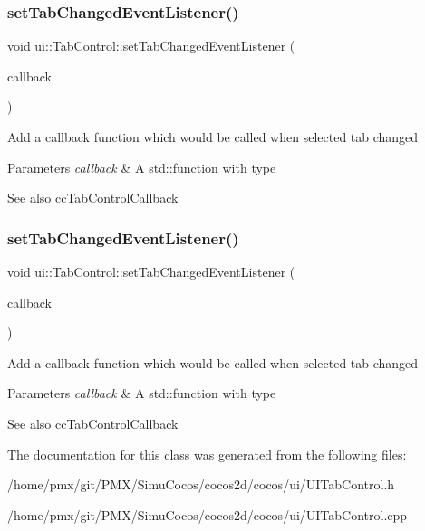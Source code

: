 \subsubsection{\texorpdfstring{set\+Tab\+Changed\+Event\+Listener()}{setTabChangedEventListener()}\hspace{0.1cm}{\footnotesize\ttfamily [1/2]}}
{\footnotesize\ttfamily void ui\+::\+Tab\+Control\+::set\+Tab\+Changed\+Event\+Listener (\begin{DoxyParamCaption}\item[{const cc\+Tab\+Control\+Callback \&}]{callback }\end{DoxyParamCaption})}

Add a callback function which would be called when selected tab changed 
\begin{DoxyParams}{Parameters}
{\em callback} & A std\+::function with type \\
\hline
\end{DoxyParams}
\begin{DoxySeeAlso}{See also}
{\ttfamily cc\+Tab\+Control\+Callback} 
\end{DoxySeeAlso}
\mbox{\label{classui_1_1TabControl_a16fecfa3c0550e2afcfe9280aa633ada}} 
\subsubsection{\texorpdfstring{set\+Tab\+Changed\+Event\+Listener()}{setTabChangedEventListener()}\hspace{0.1cm}{\footnotesize\ttfamily [2/2]}}
{\footnotesize\ttfamily void ui\+::\+Tab\+Control\+::set\+Tab\+Changed\+Event\+Listener (\begin{DoxyParamCaption}\item[{const cc\+Tab\+Control\+Callback \&}]{callback }\end{DoxyParamCaption})}

Add a callback function which would be called when selected tab changed 
\begin{DoxyParams}{Parameters}
{\em callback} & A std\+::function with type \\
\hline
\end{DoxyParams}
\begin{DoxySeeAlso}{See also}
{\ttfamily cc\+Tab\+Control\+Callback} 
\end{DoxySeeAlso}


The documentation for this class was generated from the following files\+:\begin{DoxyCompactItemize}
\item 
/home/pmx/git/\+P\+M\+X/\+Simu\+Cocos/cocos2d/cocos/ui/U\+I\+Tab\+Control.\+h\item 
/home/pmx/git/\+P\+M\+X/\+Simu\+Cocos/cocos2d/cocos/ui/U\+I\+Tab\+Control.\+cpp\end{DoxyCompactItemize}
